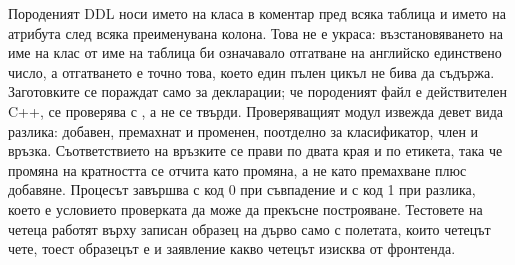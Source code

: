 Породеният DDL носи името на класа в коментар пред всяка таблица и името на атрибута след всяка
преименувана колона. Това не е украса: възстановяването на име на клас от име на таблица би означавало
отгатване на английско единствено число, а отгатването е точно това, което един пълен цикъл не бива да
съдържа. Заготовките се пораждат само за декларации; че породеният файл е действителен C++, се проверява
с , а не се твърди. Проверяващият модул извежда девет вида разлика: добавен,
премахнат и променен, поотделно за класификатор, член и връзка. Съответствието на връзките се прави по
двата края и по етикета, така че промяна на кратността се отчита като промяна, а не като премахване плюс
добавяне. Процесът завършва с код 0 при съвпадение и с код 1 при разлика, което е условието проверката
да може да прекъсне построяване. Тестовете на четеца работят върху записан образец на дърво само с
полетата, които четецът чете, тоест образецът е и заявление какво четецът изисква от фронтенда.
